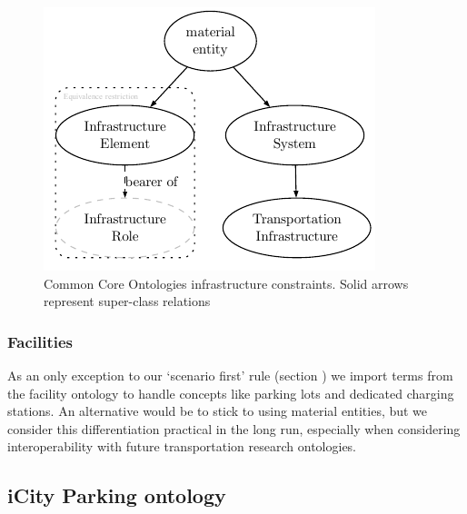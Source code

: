 \begin{figure}[h]
    \centering
    \includegraphics{images/infrastructureSystem.pdf}
    \caption{Common Core Ontologies infrastructure constraints. Solid arrows represent super-class relations}
    \label{infrastructurefigs} 
\end{figure}

\subsubsection{Facilities}

As an only exception to our `scenario first' rule (section \label{methodology})
we import terms from the facility ontology to handle concepts like parking lots
and dedicated charging stations. An alternative would be to stick to using
material entities, but we consider this differentiation practical in the long
run, especially when considering interoperability with future transportation
research ontologies.


\subsection{iCity Parking ontology}

